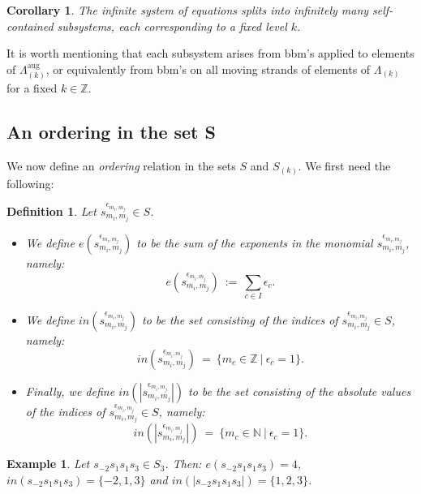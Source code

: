 \documentclass[11pt]{amsart}
\newtheorem{cor}{Corollary}
\newtheorem{defn}{Definition}
\newtheorem{ex}{Example}
\begin{document}
\begin{cor}
The infinite system of equations splits into infinitely many \emph{self-contained} subsystems, each corresponding to a fixed level \(k\).
\end{cor}

It is worth mentioning that each subsystem arises from bbm's applied to elements of \(\Lambda^{\text{aug}}_{(k)}\), or equivalently from bbm's on all moving strands of elements of \(\Lambda_{(k)}\) for a fixed \(k\in\mathbb{Z}\).















\subsection{An ordering in the set S}

We now define an {\it ordering} relation in the sets $S$ and $S_{(k)}$. We first need the following:

\begin{defn}\rm
Let $s_{m_i, m_j}^{\epsilon_{m_i, m_j}} \in S$.
\begin{itemize}
\item[i.] We define $e(s_{m_i, m_j}^{\epsilon_{m_i, m_j}})$ to be the sum of the exponents in the monomial $s_{m_i, m_j}^{\epsilon_{m_i, m_j}}$, namely:
$$e(s_{m_i, m_j}^{\epsilon_{m_i, m_j}})\ :=\ \underset{c \in I}{\sum}{\epsilon_c}.$$
\item[ii.] We define $in(s_{m_i, m_j}^{\epsilon_{m_i, m_j}})$ to be the set consisting of the indices of $s_{m_i, m_j}^{\epsilon_{m_i, m_j}} \in S$, namely:
$$in(s_{m_i, m_j}^{\epsilon_{m_i, m_j}})\ =\ \{m_c \in \mathbb{Z}\ |\ \epsilon_c=1\}.$$
\item[iii.] Finally, we define $in(|s_{m_i, m_j}^{\epsilon_{m_i, m_j}}|)$ to be the set consisting of the absolute values of the indices of $s_{m_i, m_j}^{\epsilon_{m_i, m_j}} \in S$, namely:
$$in(|s_{m_i, m_j}^{\epsilon_{m_i, m_j}}|)\ =\ \{m_c \in \mathbb{N}\ |\ \epsilon_c=1\}.$$
\end{itemize}
\end{defn}



\begin{ex}\rm
Let $s_{-2}s_1s_1s_3 \in S_{3}$. Then: $e(s_{-2}s_1s_1s_3) = 4$, $in(s_{-2}s_1s_1s_3) = \{-2, 1, 3 \}$ and $in(|s_{-2}s_1s_1s_3|) = \{1, 2, 3 \}$.
\end{ex}
\end{document}
